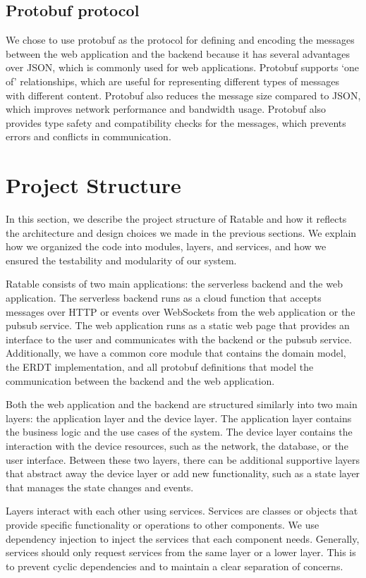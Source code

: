 \documentclass[
	english,
	ruledheaders=section,   %
	class=report,		    %
	thesis={type=bachelor}, %
	accentcolor=9c,			%
	custommargins=true,    %
	marginpar=false,        %
	parskip=half-,          %
	fontsize=11pt,          %
]{tudapub}
\begin{document}
\subsection{Protobuf protocol}
We chose to use protobuf as the protocol for defining and encoding the messages between the web application and the backend because it has several advantages over JSON, which is commonly used for web applications. Protobuf supports ‘one of’ relationships, which are useful for representing different types of messages with different content. Protobuf also reduces the message size compared to JSON, which improves network performance and bandwidth usage. Protobuf also provides type safety and compatibility checks for the messages, which prevents errors and conflicts in communication. ~\cite{protobuf}

\section{Project Structure}
In this section, we describe the project structure of Ratable and how it reflects the architecture and design choices we made in the previous sections. We explain how we organized the code into modules, layers, and services, and how we ensured the testability and modularity of our system.

Ratable consists of two main applications: the serverless backend and the web application. The serverless backend runs as a cloud function that accepts messages over HTTP or events over WebSockets from the web application or the pubsub service. The web application runs as a static web page that provides an interface to the user and communicates with the backend or the pubsub service. Additionally, we have a common core module that contains the domain model, the ERDT implementation, and all protobuf definitions that model the communication between the backend and the web application.

Both the web application and the backend are structured similarly into two main layers: the application layer and the device layer. The application layer contains the business logic and the use cases of the system. The device layer contains the interaction with the device resources, such as the network, the database, or the user interface. Between these two layers, there can be additional supportive layers that abstract away the device layer or add new functionality, such as a state layer that manages the state changes and events.

Layers interact with each other using services. Services are classes or objects that provide specific functionality or operations to other components. We use dependency injection to inject the services that each component needs. Generally, services should only request services from the same layer or a lower layer. This is to prevent cyclic dependencies and to maintain a clear separation of concerns.
\end{document}
